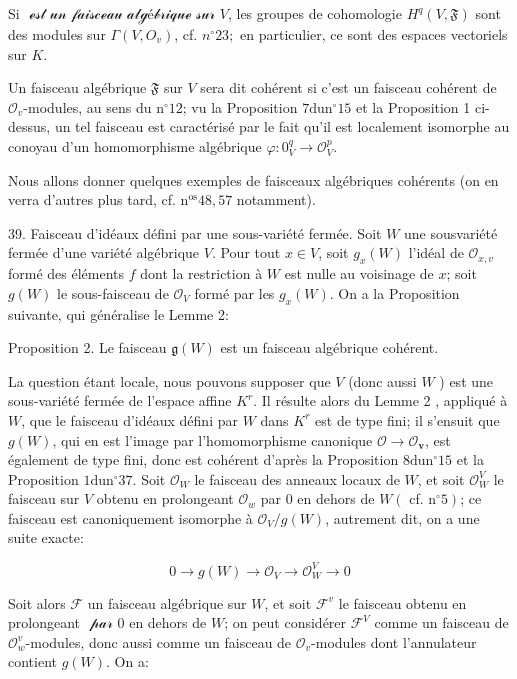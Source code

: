 Si $\mathscr{\text { est un faisceau algébrique sur }} V$, les groupes de cohomologie $H^{q}(V, \mathfrak{F})$ sont des modules sur $\Gamma\left(V, O_{v}\right)$, cf. $n^{\circ} 23 ;$ en particulier, ce sont des espaces vectoriels sur $K$.

Un faisceau algébrique $\mathfrak{F}$ sur $V$ sera dit cohérent si c'est un faisceau cohérent de $\mathcal{O}_{v}$-modules, au sens du $\mathrm{n}^{\circ} 12$; vu la Proposition $7 \mathrm{du} \mathrm{n}^{\circ} 15$ et la Proposition 1 ci-dessus, un tel faisceau est caractérisé par le fait qu'il est localement isomorphe au conoyau d'un homomorphisme algébrique $\varphi: 0_{V}^{q} \rightarrow \mathcal{O}_{V}^{p}$.

Nous allons donner quelques exemples de faisceaux algébriques cohérents (on en verra d'autres plus tard, cf. $\mathrm{n}^{\mathrm{os}} 48,57$ notamment).

39. Faisceau d'idéaux défini par une sous-variété fermée. Soit $W$ une sousvariété fermée d'une variété algébrique $V$. Pour tout $x \in V$, soit $g_{x}(W)$ l'idéal de $\mathcal{O}_{x, v}$ formé des éléments $f$ dont la restriction à $W$ est nulle au voisinage de $x$; soit $g(W)$ le sous-faisceau de $\mathcal{O}_{V}$ formé par les $g_{x}(W) .$ On a la Proposition suivante, qui généralise le Lemme 2:

Proposition 2. Le faisceau $\mathfrak{g}(W)$ est un faisceau algébrique cohérent.

La question étant locale, nous pouvons supposer que $V$ (donc aussi $W$ ) est une sous-variété fermée de l'espace affine $K^{r} .$ Il résulte alors du Lemme 2 , appliqué à $W$, que le faisceau d'idéaux défini par $W$ dans $K^{r}$ est de type fini; il s'ensuit que $g(W)$, qui en est l'image par l'homomorphisme canonique $\mathcal{O} \rightarrow \mathcal{O}_{\boldsymbol{v}}$, est également de type fini, donc est cohérent d'après la Proposition $8 \mathrm{du} \mathrm{n}^{\circ} 15$ et la Proposition $1 \mathrm{du} \mathrm{n}^{\circ} 37$. Soit $\mathcal{O}_{W}$ le faisceau des anneaux locaux de $W$, et soit $\mathcal{O}_{W}^{V}$ le faisceau sur $V$ obtenu en prolongeant $\mathcal{O}_{w}$ par 0 en dehors de $W\left(\right.$ cf. $\left.\mathrm{n}^{\circ} 5\right)$; ce faisceau est canoniquement isomorphe à $\mathcal{O}_{V} / g(W)$, autrement dit, on a une suite exacte:

$$
0 \rightarrow g(W) \rightarrow \mathcal{O}_{V} \rightarrow \mathcal{O}_{W}^{V} \rightarrow 0
$$

Soit alors $\mathcal{F}$ un faisceau algébrique sur $W$, et soit $\mathcal{F}^{v}$ le faisceau obtenu en prolongeant $\mathscr{\text { par }} 0$ en dehors de $W$; on peut considérer $\mathscr{F}^{V}$ comme un faisceau de $\mathcal{O}_{w}^{v}$-modules, donc aussi comme un faisceau de $\mathcal{O}_{v}$-modules dont l'annulateur contient $g(W)$. On a:

